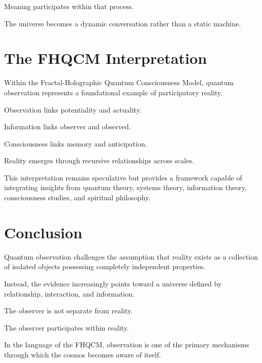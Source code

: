 Meaning participates within that process.

The universe becomes a dynamic conversation rather than a static machine.

\section{The FHQCM Interpretation}

Within the Fractal-Holographic Quantum Consciousness Model, quantum observation represents a foundational example of participatory reality.

Observation links potentiality and actuality.

Information links observer and observed.

Consciousness links memory and anticipation.

Reality emerges through recursive relationships across scales.

This interpretation remains speculative but provides a framework capable of integrating insights from quantum theory, systems theory, information theory, consciousness studies, and spiritual philosophy.

\section{Conclusion}

Quantum observation challenges the assumption that reality exists as a collection of isolated objects possessing completely independent properties.

Instead, the evidence increasingly points toward a universe defined by relationship, interaction, and information.

The observer is not separate from reality.

The observer participates within reality.

In the language of the FHQCM, observation is one of the primary mechanisms through which the cosmos becomes aware of itself.
